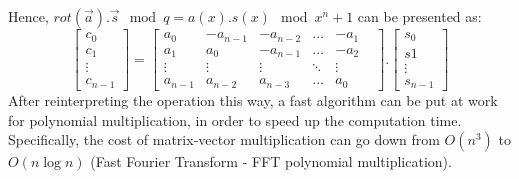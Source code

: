 \begin{description}
  Hence, $rot(\vec{a}).\vec{s} \mod q = a(x).s(x) \mod x^n + 1$ can be presented
  as:
  \[
    \begin{bmatrix}
      c_0\\
      c_1\\
      \vdots\\
      c_{n-1}
    \end{bmatrix} = \begin{bmatrix}
      a_0& -a_{n-1}& -a_{n-2}& \dots& -a_1\\
      a_1& a_0& -a_{n-1}& \dots& -a_2\\
      \vdots& \vdots& \vdots& \ddots& \vdots&\\
      a_{n-1}& a_{n-2}& a_{n-3}& \dots& a_0
    \end{bmatrix}.\begin{bmatrix} s_0 \\ s1\\ \vdots\\ s_{n-1}
    \end{bmatrix}
  \]
  After reinterpreting the operation this way, a fast algorithm can be put at work for
  polynomial multiplication, in order to speed up the computation time. Specifically, the cost of matrix-vector multiplication can go down from $O(n^3)$  to
  $O(n \log n)$ (Fast Fourier Transform - FFT polynomial multiplication).


\end{description}
